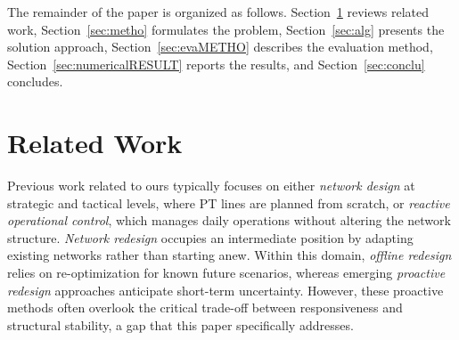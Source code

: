 \documentclass[a4paper,fleqn]{cas-sc}
\begin{document}

The remainder of the paper is organized as follows. 
Section~\ref{sec:relatedWork} reviews related work, Section~\ref{sec:metho} formulates the problem, Section~\ref{sec:alg} presents the solution approach, Section~\ref{sec:evaMETHO} describes the evaluation method, Section~\ref{sec:numericalRESULT} reports the results, and Section~\ref{sec:conclu} concludes.

\section{Related Work}\label{sec:relatedWork}

Previous work related to ours typically focuses on either \textit{network design} at strategic and tactical levels, where PT lines are planned from scratch, or \textit{reactive operational control}, which manages daily operations without altering the network structure.
\textit{Network redesign} occupies an intermediate position by adapting existing networks rather than starting anew.
Within this domain, \textit{offline redesign} relies on re-optimization for known future scenarios, whereas emerging \textit{proactive redesign} approaches anticipate short-term uncertainty.
However, these proactive methods often overlook the critical trade-off between responsiveness and structural stability, a gap that this paper specifically addresses.
\end{document}
